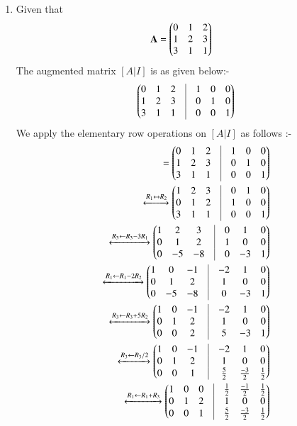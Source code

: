 \begin{enumerate}
    \item Given that
    \begin{align}
    \mathbf{A}& =\begin{pmatrix}0 & 1 & 2\\1 & 2 & 3\\3 & 1 & 1\end{pmatrix}
    \end{align}
     The augmented matrix $[A | I]$ is as given below:- 
    \begin{align}
    \myvec{0 & 1 & 2 & \vrule & 1 & 0 & 0\\1 & 2 & 3 & \vrule & 0 & 1 & 0\\3 & 1 & 1 & \vrule & 0 & 0 & 1}
    \end{align}
    We apply the elementary row operations on $[A | I]$ as follows :-
    \begin{align}
    [A | I] = \myvec{0 & 1 & 2 & \vrule & 1 & 0 & 0\\1 & 2 & 3 & \vrule & 0 & 1 & 0\\3 & 1 & 1 & \vrule & 0 & 0 & 1}
    \\
    \xleftrightarrow{R_1\leftrightarrow R_2}   
    \myvec{1 & 2 & 3 & \vrule & 0 & 1 & 0\\0 & 1 & 2 & \vrule & 1 & 0 & 0\\3 & 1 & 1 & \vrule & 0 & 0 & 1}
    \\
    \xleftrightarrow{R_3\leftarrow R_3-3R_1}   
    \myvec{1 & 2 & 3 & \vrule & 0 & 1 & 0\\0 & 1 & 2 & \vrule & 1 & 0 & 0\\0 & -5 & -8 & \vrule & 0 & -3 & 1}
    \\
    \xleftrightarrow{R_1\leftarrow R_1-2R_2}  
    \myvec{1 & 0 & -1 & \vrule & -2 & 1 & 0\\0 & 1 & 2 & \vrule & 1 & 0 & 0\\0 & -5 & -8 & \vrule & 0 & -3 & 1}
    \\
    \xleftrightarrow{R_3\leftarrow R_3+5R_2}  
    \myvec{1 & 0 & -1 & \vrule & -2 & 1 & 0\\0 & 1 & 2 & \vrule & 1 & 0 & 0\\0 & 0 & 2 & \vrule & 5 & -3 & 1}
    \\
    \xleftrightarrow{R_3\leftarrow R_3/2}
    \myvec{1 & 0 & -1 & \vrule & -2 & 1 & 0\\ 0 & 1 & 2 & \vrule & 1 & 0 & 0\\0 & 0 & 1 &\vrule &\frac{5}{2} &\frac{-3}{2} &\frac{1}{2}}
    \\
    \xleftrightarrow{R_1\leftarrow R_1+R_3}
    \myvec{1 & 0 & 0 & \vrule & \frac{1}{2} & \frac{-1}{2} & \frac{1}{2}\\ 0 & 1 & 2 & \vrule & 1 & 0 & 0\\0 & 0 & 1 &\vrule &\frac{5}{2} &\frac{-3}{2} &\frac{1}{2}}

\end{align}
\end{enumerate}
